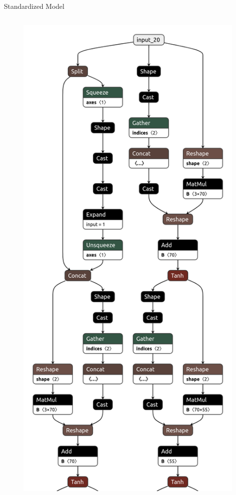 \documentclass[aspectratio=169,9pt]{beamer}
\begin{document}
\begin{frame}[t]{Standardized Model}
\begin{columns}[t]
\begin{figure}
        \includegraphics[height=0.95\textheight]{netron.png}
      \end{figure}
  \end{columns}
\end{frame}
\end{document}
